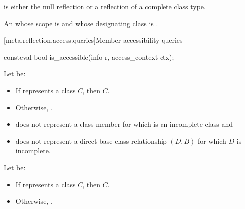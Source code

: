 \begin{itemdescr}
\pnum
\constantwhen
{} is either the null reflection
or a reflection of a complete class type.

\pnum
\returns
An  whose scope is 
and whose designating class is .
\end{itemdescr}

[meta.reflection.access.queries]{Member accessibility queries}

%
\begin{itemdecl}
consteval bool is_accessible(info r, access_context ctx);
\end{itemdecl}

\begin{itemdescr}
\pnum
Let  be:
\begin{itemize}
\item If  represents a class $C$, then $C$.
\item Otherwise, .
\end{itemize}

\pnum
\constantwhen
\begin{itemize}
\item
   does not represent a class member
  for which  is an incomplete class and
\item
   does not represent a direct base class relationship $(D, B)$
  for which $D$ is incomplete.
\end{itemize}

\pnum
Let  be:
\begin{itemize}
\item If  represents a class $C$, then $C$.
\item Otherwise, .
\end{itemize}


\end{itemdescr}
